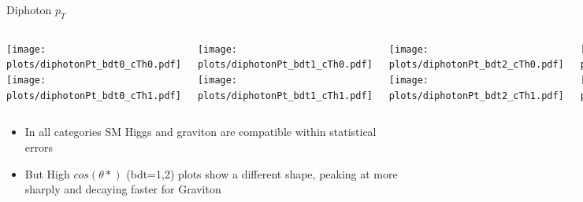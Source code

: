 \documentclass[8pt]{beamer}
\begin{document}
\begin{frame}{Diphoton $p_T$}

  \begin{block}
   
     \begin{columns}
     
      \centering
     
      \column[t]{3.0cm}
      \texttt{[image: plots/diphotonPt\_bdt0\_cTh0.pdf]} \\
      \texttt{[image: plots/diphotonPt\_bdt0\_cTh1.pdf]} 
      
      \column[t]{3.0cm}
      \texttt{[image: plots/diphotonPt\_bdt1\_cTh0.pdf]} \\
      \texttt{[image: plots/diphotonPt\_bdt1\_cTh1.pdf]}
      
      \column[t]{3.0cm}
      \texttt{[image: plots/diphotonPt\_bdt2\_cTh0.pdf]} \\
      \texttt{[image: plots/diphotonPt\_bdt2\_cTh1.pdf]}
      
      \column[t]{3.0cm}
      \texttt{[image: plots/diphotonPt\_bdt3\_cTh0.pdf]} \\
      \texttt{[image: plots/diphotonPt\_bdt3\_cTh1.pdf]}
      
    \end{columns}
  
  \end{block}

  \begin{itemize}
    \item In all categories SM Higgs and graviton are compatible within statistical errors
    \item But High $cos(\theta *)$ (bdt=1,2) plots show a different shape, peaking at more sharply and decaying faster for Graviton
  \end{itemize}
  
\end{frame}
\end{document}
